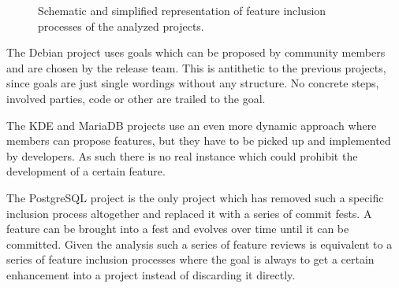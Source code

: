 \begin{figure}[htbp]
  \centering
   \qquad
   \\

  \vspace{0.5cm}

   \qquad
   \\

  \vspace{0.5cm}

   \qquad
   \\

  \vspace{0.5cm}

   \qquad
   \\

  \vspace{0.5cm}

   \qquad
   \\

  \vspace{0.5cm}

  \caption[Representation of Feature Inclusion Processes]
  {Schematic and simplified representation of feature inclusion processes of
    the analyzed projects.}
\end{figure}

The Debian project uses goals which can be proposed by community members and
are chosen by the release team. This is antithetic to the previous projects,
since goals are just single wordings without any structure. No concrete steps,
involved parties, code or other are trailed to the goal.

The KDE and MariaDB projects use an even more dynamic approach where members
can propose features, but they have to be picked up and implemented by
developers. As such there is no real instance which could prohibit the
development of a certain feature.

The PostgreSQL project is the only project which has removed such a specific
inclusion process altogether and replaced it with a series of commit fests. A
feature can be brought into a fest and evolves over time until it can be
committed. Given the analysis such a series of feature reviews is equivalent to
a series of feature inclusion processes where the goal is always to get a
certain enhancement into a project instead of discarding it directly.



